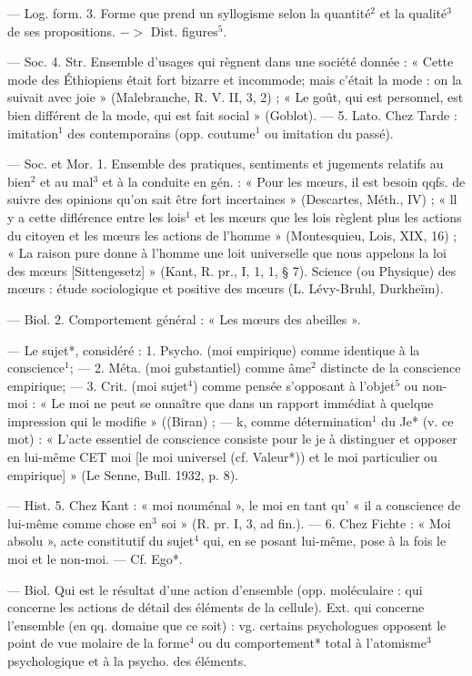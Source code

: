 \begin{itemize}[leftmargin=1cm, label=, itemsep=1pt]
— Log. form. 3. Forme que prend
un syllogisme selon la quantité$^2$ et
la qualité$^3$ de ses propositions.
$->$ Dist. figures$^5$.

 — Soc. 4. Str. Ensemble
d'usages qui règnent dans une société
donnée : « Cette mode des
Éthiopiens était fort bizarre et
incommode; mais c'était la mode :
on la suivait avec joie » (Malebranche, R. V. II, 3, 2) ; « Le goût,
qui est personnel, est bien différent
de la mode, qui est fait social »
(Goblot). — 5. Lato. Chez Tarde : imitation$^1$ des contemporains
(opp. coutume$^1$ ou imitation du
passé).

 — Soc. et Mor. 1. Ensemble
des pratiques, sentiments et jugements relatifs au bien$^2$ et au mal$^3$
et à la conduite en gén. : « Pour les
mœurs, il est besoin qqfs. de suivre
des opinions qu'on sait être fort
incertaines » (Descartes, Méth., IV) ;
« ll y a cette diflérence entre les
lois$^1$ et les mœurs que les lois règlent
plus les actions du citoyen et les
mœurs les actions de l’homme »
(Montesquieu, Lois, XIX, 16) ; « La
raison pure donne à l’homme une
loit universelle que nous appelons
la loi des mœurs [Sittengesetz] »
(Kant, R. pr., I, 1, 1, § 7). Science
(ou Physique) des mœurs : étude
sociologique et positive des mœurs
(L. Lévy-Bruhl, Durkheïm).

— Biol. 2. Comportement général : « Les mœurs des abeilles ».

 — Le sujet*, considéré : 1. Psycho.
(moi empirique) comme identique à
la conscience$^1$; — 2. Méta. (moi
gubstantiel) comme âme$^2$ distincte
de la conscience empirique; — 3.
Crit. (moi sujet$^4$) comme pensée
s'opposant à l'objet$^5$ ou non-moi :
« Le moi ne peut se onnaître que
dans un rapport immédiat à quelque
impression qui le modifie » ((Biran) ;
— k, comme détermination$^1$ du Je*
(v. ce mot) : « L’acte essentiel de
conscience consiste pour le je à distinguer et opposer en lui-même CET
moi [le moi universel (cf. Valeur*))
et le moi particulier ou empirique] » (Le Senne, Bull. 1932, p. 8).

— Hist. 5. Chez Kant : « moi nouménal », le moi en tant qu’ « il a
conscience de lui-même comme
chose en$^3$ soi » (R. pr. I, 3, ad fin.). —
6. Chez Fichte : « Moi absolu », acte
constitutif du sujet$^4$ qui, en se posant lui-même, pose à la fois le moi
et le non-moi. — Cf. Ego*.

 — Biol. Qui est le résultat
d’une action d'ensemble (opp. moléculaire : qui concerne les actions de
détail des éléments de la cellule).
Ext. qui concerne l’ensemble (en
qq. domaine que ce soit) : vg. certains psychologues opposent le point
de vue molaire de la forme$^4$ ou du
comportement* total à l’atomisme$^3$
psychologique et à la psycho. des
éléments.


\end{itemize}
